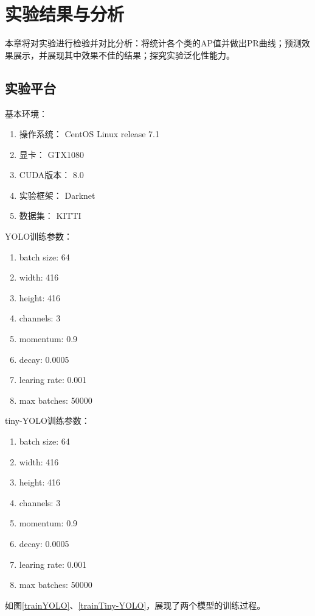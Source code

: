 \chapter{实验结果与分析}
本章将对实验进行检验并对比分析：将统计各个类的AP值并做出PR曲线；预测效果展示，并展现其中效果不佳的结果；探究实验泛化性能力。
\section{实验平台}{
	基本环境：
	\begin{enumerate}
		\item 操作系统： CentOS Linux release 7.1
		\item 显卡： GTX1080
		\item CUDA版本： 8.0
		\item 实验框架： Darknet
		\item 数据集： KITTI
	\end{enumerate}

	YOLO训练参数：
	\begin{enumerate}
		\item batch size: 64
		\item width: 416
		\item height: 416
		\item channels: 3
		\item momentum: 0.9
		\item decay: 0.0005
		\item learing rate: 0.001
		\item max batches: 50000
	\end{enumerate}

	tiny-YOLO训练参数：
	\begin{enumerate}
		\item batch size: 64
		\item width: 416
		\item height: 416
		\item channels: 3
		\item momentum: 0.9
		\item decay: 0.0005
		\item learing rate: 0.001
		\item max batches: 50000
	\end{enumerate}

	如图\ref{trainYOLO}、\ref{trainTiny-YOLO}，展现了两个模型的训练过程。

}

